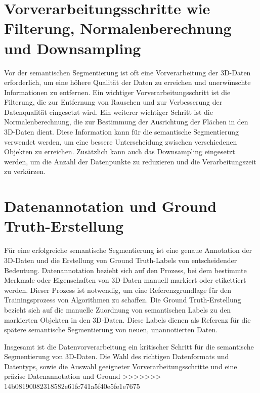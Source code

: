 \section{Vorverarbeitungsschritte wie Filterung, Normalenberechnung und Downsampling}
Vor der semantischen Segmentierung ist oft eine Vorverarbeitung der 3D-Daten
erforderlich, um eine höhere Qualität der Daten zu erreichen und unerwünschte
Informationen zu entfernen. Ein wichtiger Vorverarbeitungsschritt ist die
Filterung, die zur Entfernung von Rauschen und zur Verbesserung der
Datenqualität eingesetzt wird. Ein weiterer wichtiger Schritt ist die
Normalenberechnung, die zur Bestimmung der Ausrichtung der Flächen in den
3D-Daten dient. Diese Information kann für die semantische Segmentierung
verwendet werden, um eine bessere Unterscheidung zwischen verschiedenen
Objekten zu erreichen. Zusätzlich kann auch das Downsampling eingesetzt werden,
um die Anzahl der Datenpunkte zu reduzieren und die Verarbeitungszeit zu
verkürzen.
\section{Datenannotation und Ground Truth-Erstellung}
Für eine erfolgreiche semantische Segmentierung ist eine genaue Annotation der
3D-Daten und die Erstellung von Ground Truth-Labels von entscheidender
Bedeutung. Datenannotation bezieht sich auf den Prozess, bei dem bestimmte
Merkmale oder Eigenschaften von 3D-Daten manuell markiert oder etikettiert
werden. Dieser Prozess ist notwendig, um eine Referenzgrundlage für den
Trainingsprozess von Algorithmen zu schaffen. Die Ground Truth-Erstellung
bezieht sich auf die manuelle Zuordnung von semantischen Labels zu den
markierten Objekten in den 3D-Daten. Diese Labels dienen als Referenz für die
spätere semantische Segmentierung von neuen, unannotierten Daten.

Insgesamt ist die Datenvorverarbeitung ein kritischer Schritt für die
semantische Segmentierung von 3D-Daten. Die Wahl des richtigen Datenformats und
Datentyps, sowie die Auswahl geeigneter Vorverarbeitungsschritte und eine
präzise Datenannotation und Ground
>>>>>>> 14b08190082318582e61fc741a5f40e5fe1e7675
